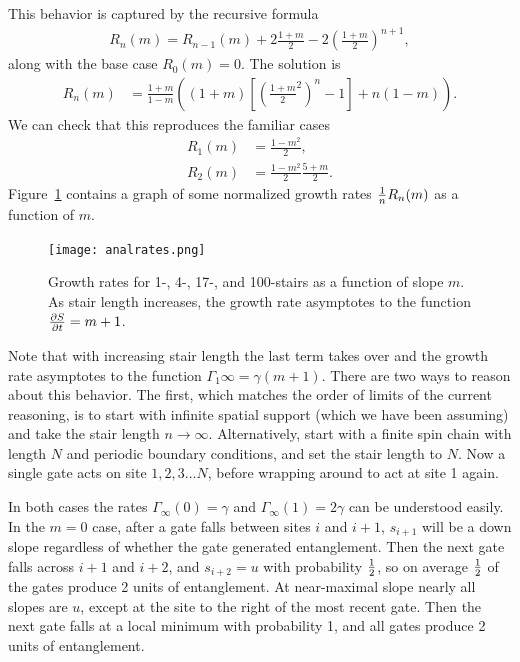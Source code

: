 This behavior is captured by the recursive formula
\begin{align}
R_n(m) = R_{n-1}(m)+2\frac{1+m}{2} - 2\left(\frac{1+m}{2}\right)^{n+1}, \label{eqn:raterecur}
\end{align}
along with the base case $R_0(m)=0$. The solution is
\begin{align}
R_n(m) &=\frac{1+m}{1-m}\left((1+m)\left[\left(\frac{1+m}{2}^2
	\right)^n-1\right]+n(1-m)\right).
\end{align}
We can check that this reproduces the familiar cases
\begin{align}
R_1(m) &= \frac{1-m^2}{2},\\
R_2(m) &= \frac{1-m^2}{2}\frac{5+m}{2}.
\end{align}
Figure~\ref{fig:growthrates} contains a graph of some normalized growth rates $\frac{1}{n}R_n(m)$ as a function of $m$.

\begin{figure}
	\centering
	\texttt{[image: analrates.png]}
	\caption{Growth rates for 1-, 4-, 17-, and 100-stairs as a function of slope $m$. As stair length increases, the growth rate asymptotes to the function $\frac{\partial S}{\partial t} = m+1$.}
	\label{fig:growthrates}
\end{figure}

Note that with increasing stair length the last term takes over and the growth rate asymptotes to the function $\Gamma_1\infty = \gamma(m+1)$. There are two ways to reason about this behavior. The first, which matches the order of limits of the current reasoning, is to start with infinite spatial support (which we have been assuming) and take the stair length $n\to\infty$. 
Alternatively, start with a finite spin chain with length $N$ and periodic boundary conditions, and set the stair length to $N$. Now a single gate acts on site $1,2,3\dots N$, before wrapping around to act at site 1 again. 

In both cases the rates $\Gamma_\infty(0)=\gamma$ and $\Gamma_\infty(1) = 2\gamma$ can be understood easily. In the $m=0$ case, after a gate falls between sites $i$ and $i+1$, $s_{i+1}$ will be a down slope regardless of whether the gate generated entanglement. Then the next gate falls across $i+1$ and $i+2$, and $s_{i+2}=u$ with probability $\frac{1}{2}$, so on average $\frac{1}{2}$ of the gates produce 2 units of entanglement. At near-maximal slope nearly all slopes are $u$, except at the site to the right of the most recent gate. Then the next gate falls at a local minimum with probability 1, and all gates produce 2 units of entanglement.

